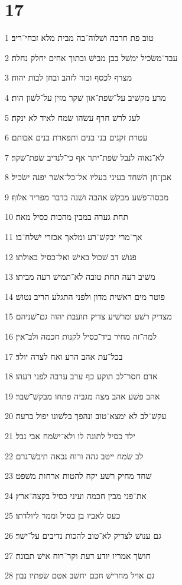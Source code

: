 \chapter{17}

\par 1 טוב פת חרבה ושׁלוה־בה מבית מלא זבחי־ריב׃
\par 2 עבד־משׂכיל ימשׁל בבן מבישׁ ובתוך אחים יחלק נחלה׃
\par 3 מצרף לכסף וכור לזהב ובחן לבות יהוה׃
\par 4 מרע מקשׁיב על־שׂפת־און שׁקר מזין על־לשׁון הות׃
\par 5 לעג לרשׁ חרף עשׂהו שׂמח לאיד לא ינקה׃
\par 6 עטרת זקנים בני בנים ותפארת בנים אבותם׃
\par 7 לא־נאוה לנבל שׂפת־יתר אף כי־לנדיב שׂפת־שׁקר׃
\par 8 אבן־חן השׁחד בעיני בעליו אל־כל־אשׁר יפנה ישׂכיל׃
\par 9 מכסה־פשׁע מבקשׁ אהבה ושׁנה בדבר מפריד אלוף׃
\par 10 תחת גערה במבין מהכות כסיל מאה׃
\par 11 אך־מרי יבקשׁ־רע ומלאך אכזרי ישׁלח־בו׃
\par 12 פגושׁ דב שׁכול באישׁ ואל־כסיל באולתו׃
\par 13 משׁיב רעה תחת טובה לא־תמישׁ רעה מביתו׃
\par 14 פוטר מים ראשׁית מדון ולפני התגלע הריב נטושׁ׃
\par 15 מצדיק רשׁע ומרשׁיע צדיק תועבת יהוה גם־שׁניהם׃
\par 16 למה־זה מחיר ביד־כסיל לקנות חכמה ולב־אין׃
\par 17 בכל־עת אהב הרע ואח לצרה יולד׃
\par 18 אדם חסר־לב תוקע כף ערב ערבה לפני רעהו׃
\par 19 אהב פשׁע אהב מצה מגביה פתחו מבקשׁ־שׁבר׃
\par 20 עקשׁ־לב לא ימצא־טוב ונהפך בלשׁונו יפול ברעה׃
\par 21 ילד כסיל לתוגה לו ולא־ישׂמח אבי נבל׃
\par 22 לב שׂמח ייטב גהה ורוח נכאה תיבשׁ־גרם׃
\par 23 שׁחד מחיק רשׁע יקח להטות ארחות משׁפט׃
\par 24 את־פני מבין חכמה ועיני כסיל בקצה־ארץ׃
\par 25 כעס לאביו בן כסיל וממר ליולדתו׃
\par 26 גם ענושׁ לצדיק לא־טוב להכות נדיבים על־ישׁר׃
\par 27 חושׂך אמריו יודע דעת וקר־רוח אישׁ תבונה׃
\par 28 גם אויל מחרישׁ חכם יחשׁב אטם שׂפתיו נבון׃

